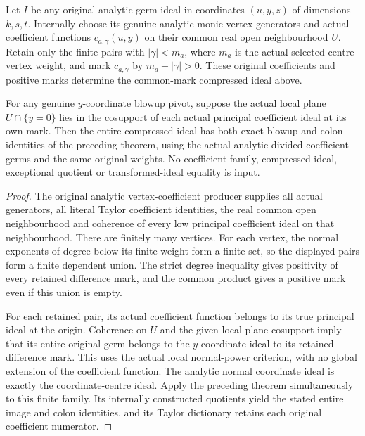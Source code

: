 \begin{theorem}
\label{hir:actual-original-weighted-coefficient-compression}
\leanok
Let $I$ be any original analytic germ ideal in coordinates $(u,y,z)$ of dimensions
$k,s,t$. Internally choose its genuine analytic monic vertex generators and
actual coefficient functions $c_{a,\gamma}(u,y)$ on their common real open
neighbourhood $U$. Retain only the finite pairs with
$|\gamma|<m_a$, where $m_a$ is the actual selected-centre vertex weight, and mark
$c_{a,\gamma}$ by $m_a-|\gamma|>0$. These original coefficients and positive
marks determine the common-mark compressed ideal above.

For any genuine $y$-coordinate blowup pivot, suppose the actual local plane
$U\cap\{y=0\}$ lies in the cosupport of each actual principal coefficient ideal
at its own mark. Then the entire compressed ideal has both exact blowup and
colon identities of the preceding theorem, using the actual analytic divided
coefficient germs and the same original weights. No coefficient family,
compressed ideal, exceptional quotient or transformed-ideal equality is input.
\end{theorem}
\begin{proof}
The original analytic vertex-coefficient producer supplies all actual generators,
all literal Taylor coefficient identities, the real common open neighbourhood
and coherence of every low principal coefficient ideal on that neighbourhood.
There are finitely many vertices. For each vertex, the normal exponents of
degree below its finite weight form a finite set, so the displayed pairs form a
finite dependent union. The strict degree inequality gives positivity of every
retained difference mark, and the common product gives a positive mark even if
this union is empty.

For each retained pair, its actual coefficient function belongs to its true
principal ideal at the origin. Coherence on $U$ and the given local-plane
cosupport imply that its entire original germ belongs to the $y$-coordinate
ideal to its retained difference mark. This uses the actual local normal-power
criterion, with no global extension of the coefficient function. The analytic
normal coordinate ideal is exactly the coordinate-centre ideal. Apply the
preceding theorem simultaneously to this finite family. Its internally
constructed quotients yield the stated entire image and colon identities, and
its Taylor dictionary retains each original coefficient numerator.
\end{proof}

